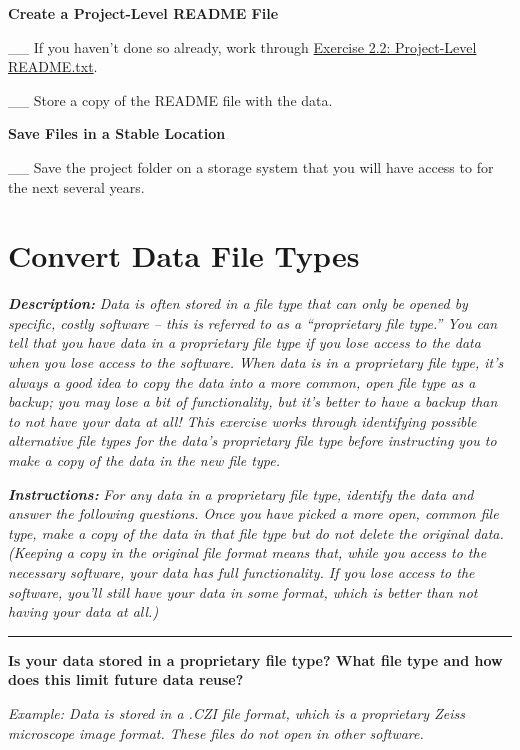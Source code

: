 \documentclass[
]{book}
\begin{document}
\textbf{Create a Project-Level README File}

\_\_ If you haven't done so already, work through \protect\hyperlink{readme-txt}{Exercise 2.2: Project-Level README.txt}.

\_\_ Store a copy of the README file with the data.

\textbf{Save Files in a Stable Location}

\_\_ Save the project folder on a storage system that you will have access to for the next several years.

\newpage

\hypertarget{file-type}{%
\section{Convert Data File Types}\label{file-type}}

\textbf{\emph{Description:}} \emph{Data is often stored in a file type that can only be opened by specific, costly software -- this is referred to as a ``proprietary file type.'' You can tell that you have data in a proprietary file type if you lose access to the data when you lose access to the software. When data is in a proprietary file type, it's always a good idea to copy the data into a more common, open file type as a backup; you may lose a bit of functionality, but it's better to have a backup than to not have your data at all! This exercise works through identifying possible alternative file types for the data's proprietary file type before instructing you to make a copy of the data in the new file type.}

\textbf{\emph{Instructions:}} \emph{For any data in a proprietary file type, identify the data and answer the following questions. Once you have picked a more open, common file type, make a copy of the data in that file type but do not delete the original data. (Keeping a copy in the original file format means that, while you access to the necessary software, your data has full functionality. If you lose access to the software, you'll still have your data in some format, which is better than not having your data at all.)}

\begin{center}\rule{0.5\linewidth}{0.5pt}\end{center}

\textbf{Is your data stored in a proprietary file type? What file type and how does this limit future data reuse?}

\emph{Example: Data is stored in a .CZI file format, which is a proprietary Zeiss microscope image format. These files do not open in other software.}
\end{document}
